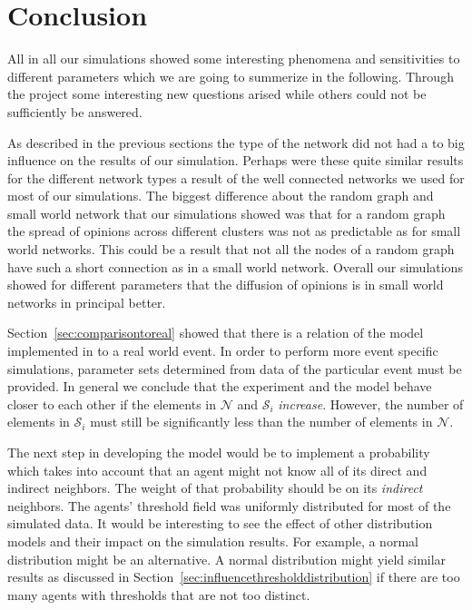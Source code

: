 
\section{Conclusion}
\label{sec:conclusion}

All in all our simulations showed some interesting phenomena and sensitivities
to different parameters which we are going to summerize in the
following. Through the project some interesting new questions arised while
others could not be sufficiently be answered.

As described in the previous sections the type of the network did not had a to
big influence on the results of our simulation. Perhaps were these quite
similar results for the different network types a result of the well connected
networks we used for most of our simulations. The biggest difference about the
random graph and small world network that our simulations showed was that for a
random graph the spread of opinions across different clusters was not as
predictable as for small world networks. This could be a result that not all
the nodes of a random graph have such a short connection as in a small world
network. Overall our simulations showed for different parameters that the
diffusion of opinions is in small world networks in principal better.

Section~\ref{sec:comparisontoreal} showed that there is a relation of the model
implemented in \matlab to a real world event.  In order to perform more event
specific simulations, parameter sets determined from data of the particular
event must be provided.  In general we conclude that the experiment and the
model behave closer to each other if the elements in $\mathcal{N}$ and
$\mathcal{S}_i$ \emph{increase}.  However, the number of elements in
$\mathcal{S}_i$ must still be significantly less than the number of elements in
$\mathcal{N}$.

The next step in developing the model would be to implement a probability which
takes into account that an agent might not know all of its direct and indirect
neighbors.  The weight of that probability should be on its \emph{indirect}
neighbors.  The agents' threshold field was uniformly distributed for most of
the simulated data.  It would be interesting to see the effect of other
distribution models and their impact on the simulation results.  For example, a
normal distribution might be an alternative.  A normal distribution might yield
similar results as discussed in
Section~\ref{sec:influencethresholddistribution} if there are too many agents
with thresholds that are not too distinct.



